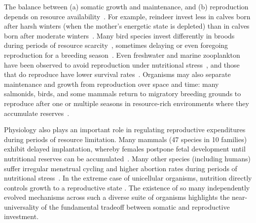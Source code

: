 \documentclass[twocolumn,preprintnumbers,amsmath,amssymb,superscriptaddress]{revtex4}
\begin{document}
The balance between (a) somatic growth and maintenance, and (b) reproduction depends on resource availability~\citep{Morris:1987eo}.
For example, reindeer invest less in calves born after harsh winters (when the mother's energetic state is depleted) than in calves born after moderate winters~\citep{Tveraa:2003fq}.
Many bird species invest differently in broods during periods of resource scarcity~\citep{Daan:1988va,Jacot:2009dv}, sometimes delaying or even foregoing reproduction for a breeding season~\citep{Martin:1987dl,Stearns:1989ip,Barboza:2002in}.
Even freshwater and marine zooplankton have been observed to avoid reproduction under nutritional stress~\citep{Threlkeld:1976ih}, and those that do reproduce have lower survival rates~\citep{Kirk:1997cc}.
Organisms may also separate maintenance and growth from reproduction over space and time: many salmonids, birds, and some mammals return to migratory breeding grounds to reproduce after one or multiple seasons in resource-rich environments where they accumulate reserves~\citep{Weber:1998jg,Mduma:1999cp,Moore:2014hi}.

Physiology also plays an important role in regulating reproductive expenditures during periods of resource limitation.
Many mammals (47 species in 10 families) exhibit delayed implantation, whereby females postpone fetal development until nutritional reserves can be accumulated~\citep{Mead:1989dt,Sandell:1990kw}.
Many other species (including humans) suffer irregular menstrual cycling and higher abortion rates during periods of nutritional stress~\citep{Bulik:1999eo,Trites:2003cc}.
In the extreme case of unicellular organisms, nutrition directly controls growth to a reproductive state \citep{Glazier:2009hq,Kempes:2012hy}. The existence of so many independently evolved mechanisms across such a diverse suite of organisms highlights the near-universality of the fundamental tradeoff between somatic and reproductive investment.
\end{document}
